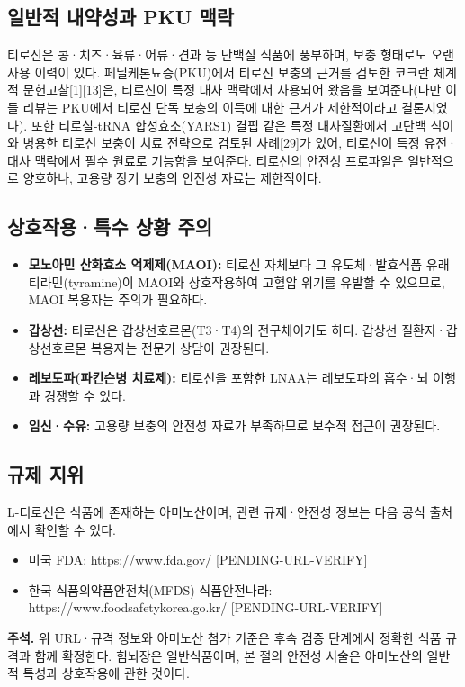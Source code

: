 \documentclass[11pt,oneside]{book}
\newenvironment{authnote}
  {\par\smallskip\begingroup\leftskip=7mm\rightskip=5mm\small\color{muted}\noindent\ignorespaces}
  {\par\endgroup\smallskip}
\begin{document}
\subsection{일반적 내약성과 PKU 맥락}
티로신은 콩·치즈·육류·어류·견과 등 단백질 식품에 풍부하며, 보충 형태로도 오랜 사용 이력이 있다. 페닐케톤뇨증(PKU)에서 티로신 보충의 근거를 검토한 코크란 체계적 문헌고찰[1][13]은, 티로신이 특정 대사 맥락에서 사용되어 왔음을 보여준다(다만 이들 리뷰는 PKU에서 티로신 단독 보충의 이득에 대한 근거가 제한적이라고 결론지었다). 또한 티로실-tRNA 합성효소(YARS1) 결핍 같은 특정 대사질환에서 고단백 식이와 병용한 티로신 보충이 치료 전략으로 검토된 사례[29]가 있어, 티로신이 특정 유전·대사 맥락에서 필수 원료로 기능함을 보여준다. 티로신의 안전성 프로파일은 일반적으로 양호하나, 고용량 장기 보충의 안전성 자료는 제한적이다.

\subsection{상호작용·특수 상황 주의}
\begin{itemize}[leftmargin=6mm,itemsep=1pt,topsep=2pt]
  \item \textbf{모노아민 산화효소 억제제(MAOI):} 티로신 자체보다 그 유도체·발효식품 유래 티라민(tyramine)이 MAOI와 상호작용하여 고혈압 위기를 유발할 수 있으므로, MAOI 복용자는 주의가 필요하다.
  \item \textbf{갑상선:} 티로신은 갑상선호르몬(T3·T4)의 전구체이기도 하다. 갑상선 질환자·갑상선호르몬 복용자는 전문가 상담이 권장된다.
  \item \textbf{레보도파(파킨슨병 치료제):} 티로신을 포함한 LNAA는 레보도파의 흡수·뇌 이행과 경쟁할 수 있다.
  \item \textbf{임신·수유:} 고용량 보충의 안전성 자료가 부족하므로 보수적 접근이 권장된다.
\end{itemize}
\subsection{규제 지위}
L-티로신은 식품에 존재하는 아미노산이며, 관련 규제·안전성 정보는 다음 공식 출처에서 확인할 수 있다.

\begin{itemize}[leftmargin=6mm,itemsep=1pt,topsep=2pt]
  \item 미국 FDA: https://www.fda.gov/ [PENDING-URL-VERIFY]
  \item 한국 식품의약품안전처(MFDS) 식품안전나라: https://www.foodsafetykorea.go.kr/ [PENDING-URL-VERIFY]
\end{itemize}
\begin{authnote}\textbf{주석.} 위 URL·규격 정보와 아미노산 첨가 기준은 후속 검증 단계에서 정확한 식품 규격과 함께 확정한다. 힘뇌장은 일반식품이며, 본 절의 안전성 서술은 아미노산의 일반적 특성과 상호작용에 관한 것이다.\end{authnote}
\end{document}
